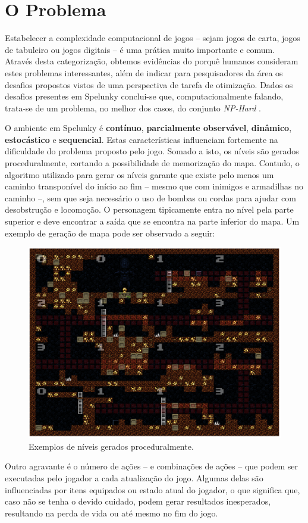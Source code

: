 \chapter{\label{chap:problem}O Problema}
Estabelecer a complexidade computacional de jogos -- sejam jogos de carta,
jogos de tabuleiro ou jogos digitais -- é uma prática muito importante e comum.
Através desta categorização, obtemos evidências do porquê humanos consideram
estes problemas interessantes, além de indicar para pesquisadores da área os
desafios propostos vistos de uma perspectiva de tarefa de otimização.  Dados os
desafios presentes em Spelunky conclui-se que, computacionalmente falando,
trata-se de um problema, no melhor dos casos, do conjunto \textit{NP-Hard}
\cite{SPELUNKYHARD}.

O ambiente em Spelunky é \textbf{contínuo}, \textbf{parcialmente observável},
\textbf{dinâmico}, \textbf{estocástico} e \textbf{sequencial}. Estas
características influenciam fortemente na dificuldade do problema proposto pelo
jogo. Somado a isto, os níveis são gerados proceduralmente, cortando a
possibilidade de memorização do mapa. Contudo, o algoritmo utilizado para gerar
os níveis garante que existe pelo menos um caminho transponível do início ao fim
-- mesmo que com inimigos e armadilhas no caminho --, sem que seja necessário o
uso de bombas ou cordas para ajudar com desobstrução e locomoção. O personagem
tipicamente entra no nível pela parte superior e deve encontrar a saída que se
encontra na parte inferior do mapa. Um exemplo de geração de mapa pode ser
observado a seguir:

\begin{figure}[htb!]
\centering\includegraphics[width=.65\textwidth]{fig/spelunky-level-example.png}
\caption {\label{fig:spelunky-level-example}Exemplos de níveis gerados
proceduralmente.} \end{figure}

Outro agravante é o número de ações -- e combinações de ações -- que podem ser
executadas pelo jogador a cada atualização do jogo. Algumas delas são
influenciadas por itens equipados ou estado atual do jogador, o que significa
que, caso não se tenha o devido cuidado, podem gerar resultados inesperados,
resultando na perda de vida ou até mesmo no fim do jogo.

